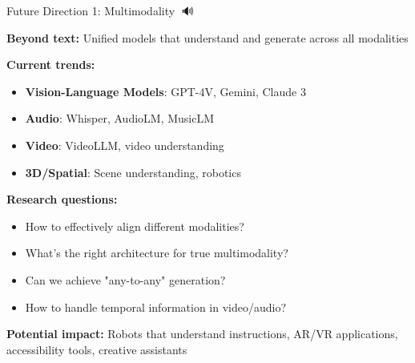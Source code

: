\documentclass[aspectratio=169]{beamer}
\begin{document}
\begin{frame}[shrink=10]{Future Direction 1: Multimodality 🎨🔊}
\begin{futurebox}
\textbf{Beyond text:} Unified models that understand and generate across all modalities
\end{futurebox}

\textbf{Current trends:}
\begin{itemize}\setlength{\itemsep}{0pt}
    \item \textbf{Vision-Language Models}: GPT-4V, Gemini, Claude 3
    \item \textbf{Audio}: Whisper, AudioLM, MusicLM
    \item \textbf{Video}: VideoLLM, video understanding
    \item \textbf{3D/Spatial}: Scene understanding, robotics
\end{itemize}

\vspace{0.5em}

\textbf{Research questions:}
\begin{itemize}\setlength{\itemsep}{0pt}
    \item How to effectively align different modalities?
    \item What's the right architecture for true multimodality?
    \item Can we achieve "any-to-any" generation?
    \item How to handle temporal information in video/audio?
\end{itemize}

\vspace{0.5em}

\textbf{Potential impact:}
Robots that understand instructions, AR/VR applications, accessibility tools, creative assistants
\end{frame}
\end{document}
